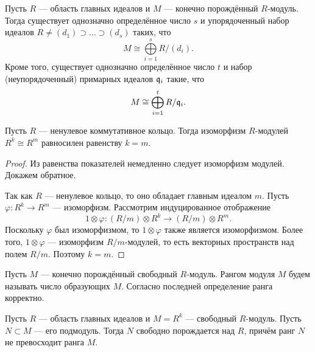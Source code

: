 
\begin{theorem} \label{classification}
	Пусть $ R $ --- область главных идеалов и $ M $ --- конечно порождённый $ R $-модуль.
	Тогда существует однозначно определённое число $ s $ и 
	упорядоченный набор идеалов $ R \neq (d_1) \supset \ldots \supset (d_s) $ таких, что
	$$ M \cong \bigoplus\limits_{i = 1}^{s} R / (d_i). $$
	Кроме того, существует однозначно определённое число $ t $
	и набор (неупорядоченный) примарных идеалов $ \mathfrak{q}_i $
	такие, что
	$$ M \cong \bigoplus\limits_{i = 1}^{t} R / \mathfrak{q}_i. $$
\end{theorem}

\begin{lemma} \label{rank}
	Пусть $ R $ --- ненулевое коммутативное кольцо.
	Тогда изоморфизм $ R $-модулей $ R^k \cong R^m $ равносилен равенству $ k = m $.
\end{lemma}

\begin{proof}
	Из равенства показателей немедленно следует изоморфизм модулей. Докажем обратное.
	
	Так как $ R $ --- ненулевое кольцо, то оно обладает главным идеалом $ m $.
	Пусть $ \varphi \colon R^k \to R^m $ --- изоморфизм.
	Рассмотрим индуцированное отображение 
	$$ 1 \otimes \varphi \colon (R/m) \otimes R^k \to (R/m) \otimes R^m. $$
	Поскольку $ \varphi $ был изоморфизмом, то $ 1 \otimes \varphi $ также является изоморфизмом.
	Более того, $ 1 \otimes \varphi $ --- изоморфизм $ R/m $-модулей, 
	то есть векторных пространств над полем $ R/m $. Поэтому $ k = m $.
\end{proof}

Пусть $ M $ --- конечно порождённый свободный $ R $-модуль. 
\textcolor{defcolor}{Рангом} модуля $ M $ будем называть число образующих $ M $.
Согласно последней определение ранга корректно.

\begin{lemma} \label{free submodule}
	Пусть $ R $ --- область главных идеалов и $ M = R^k $ --- свободный $ R $-модуль.
	Пусть $ N \subset M $ --- его подмодуль. Тогда $ N $ свободно порождается над $ R $,
	причём ранг $ N $ не превосходит ранга $ M $.
\end{lemma}

